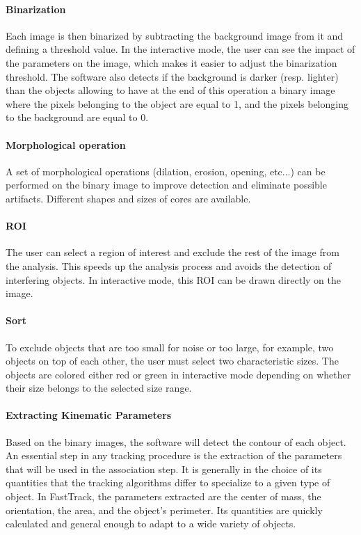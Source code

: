 		\paragraph{Binarization}
		Each image is then binarized by subtracting the background image from it and defining a threshold value. In the interactive mode, the user can see the impact of the parameters on the image, which makes it easier to adjust the binarization threshold. The software also detects if the background is darker (resp. lighter) than the objects allowing to have at the end of this operation a binary image where the pixels belonging to the object are equal to 1, and the pixels belonging to the background are equal to 0.
		\paragraph{Morphological operation}
		A set of morphological operations (dilation, erosion, opening, etc...) can be performed on the binary image to improve detection and eliminate possible artifacts. Different shapes and sizes of cores are available.
		\paragraph{ROI}
		The user can select a region of interest and exclude the rest of the image from the analysis. This speeds up the analysis process and avoids the detection of interfering objects. In interactive mode, this ROI can be drawn directly on the image.
		\paragraph{Sort}
		To exclude objects that are too small for noise or too large, for example, two objects on top of each other, the user must select two characteristic sizes. The objects are colored either red or green in interactive mode depending on whether their size belongs to the selected size range.
		\paragraph{Extracting Kinematic Parameters}
		Based on the binary images, the software will detect the contour of each object. An essential step in any tracking procedure is the extraction of the parameters that will be used in the association step. It is generally in the choice of its quantities that the tracking algorithms differ to specialize to a given type of object. In FastTrack, the parameters extracted are the center of mass, the orientation, the area, and the object's perimeter. Its quantities are quickly calculated and general enough to adapt to a wide variety of objects.


